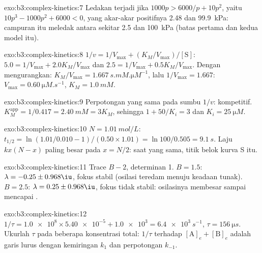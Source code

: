 \begin{solution}{exo:b3:complex-kinetics:7}
Ledakan terjadi jika $1000p > 6000/p + 10p^2$, yaitu $10p^3 - 1000p^2 + 6000 < 0$, yang
akar-akar positifnya 2.48 dan \qty{99.9}{kPa}: campuran itu meledak antara
sekitar 2.5 dan \qty{100}{kPa} (batas pertama dan kedua model itu).
\end{solution}

\begin{solution}{exo:b3:complex-kinetics:8}
$1/v = 1/V_{\max} + (K_M/V_{\max})/[\mathrm S]$: $5.0 = 1/V_{\max} + 2.0K_M/V_{\max}$ dan $2.5 = 1/V_{\max} + 0.5K_M/V_{\max}$.
Dengan mengurangkan: $K_M/V_{\max} = \qty{1.667}{s.mM.\micro M^{-1}}$, lalu $1/V_{\max} = 1.667$:
$V_{\max} = \qty{0.60}{\micro M.s^{-1}}$, $K_M = \qty{1.0}{mM}$.
\end{solution}

\begin{solution}{exo:b3:complex-kinetics:9}
Perpotongan yang sama pada sumbu $1/v$: kompetitif. $K_M^{\mathrm{app}} = 1/0.417 = \qty{2.40}{mM} = 3K_M$,
sehingga $1 + 50/K_i = 3$ dan $K_i = \qty{25}{\micro M}$.
\end{solution}

\begin{solution}{exo:b3:complex-kinetics:10}
$N = \qty{1.01}{mol/L}$: $t_{1/2} = \ln(1.01/0.010 - 1)/(0.50 \times 1.01) = \ln100/0.505 = \qty{9.1}{s}$.
Laju $kx(N - x)$ paling besar pada $x = N/2$: saat yang sama, titik belok
kurva S itu.
\end{solution}

\begin{solution}{exo:b3:complex-kinetics:11}
Trace $B - 2$, determinan 1. $B = 1.5$: $\lambda = -0.25 \pm 0.968\iu$, fokus stabil
(osilasi teredam menuju keadaan tunak). $B = 2.5$: $\lambda = 0.25 \pm 0.968\iu$,
fokus tidak stabil: osilasinya membesar sampai mencapai .
\end{solution}

\begin{solution}{exo:b3:complex-kinetics:12}
$1/\tau = \num{1.0e8} \times \num{5.40e-5} + \num{1.0e3} = \qty{6.4e3}{s^{-1}}$, $\tau = \qty{156}{\micro s}$.
Ukurlah $\tau$ pada beberapa konsentrasi total: $1/\tau$ terhadap
$[\mathrm A]_e + [\mathrm B]_e$ adalah garis lurus dengan kemiringan $k_1$ dan
perpotongan $k_{-1}$.
\end{solution}

